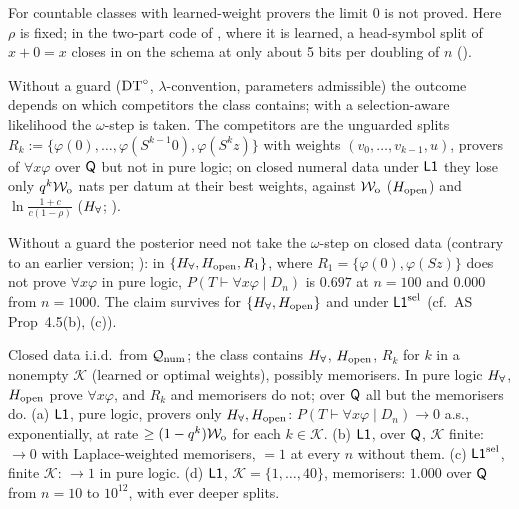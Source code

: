 \noindent For countable classes with learned-weight provers the limit $0$ is not proved. Here $\rho$ is fixed; in the two-part code of , where it is learned, a head-symbol split of $x+0=x$ closes in on the schema at only about 5 bits per doubling of $n$ ().

Without a guard ($\mathrm{DT}^{\circ}$, $\lambda$-convention, parameters admissible) the outcome depends on which competitors the class contains; with a selection-aware likelihood the $\omega$-step is taken. The competitors are the unguarded splits $R_k:=\{\varphi(0),\dots,\varphi(S^{k-1}0),\varphi(S^kz)\}$ with weights $(v_0,\dots,v_{k-1},u)$, provers of $\forall x\varphi$ over $\mathsf{Q}$ but not in pure logic; on closed numeral data under $\mathord{\mathsf{L1}}$ they lose only $q^k\mathcal{W}_{\mathrm{o}}$ nats per datum at their best weights, against $\mathcal{W}_{\mathrm{o}}$ ($H_{\mathrm{open}}$) and $\ln\frac{1+c}{c(1-\rho)}$ ($H_{\forall}$; ).

\begin{remark}\label{rem:univ:openrefuted}
Without a guard the posterior need not take the $\omega$-step on closed data (contrary to an earlier version; ): in $\{H_{\forall},H_{\mathrm{open}},R_1\}$, where $R_1=\{\varphi(0),\varphi(Sz)\}$ does not prove $\forall x\varphi$ in pure logic, $P(T\vdash\forall x\varphi\mid D_n)$ is $0.697$ at $n=100$ and $0.000$ from $n=1000$. The claim survives for $\{H_{\forall},H_{\mathrm{open}}\}$ and under $\mathord{\mathsf{L1}}^{\mathrm{sel}}$ (cf.\ AS Prop~4.5(b), (c)).
\end{remark}

\begin{proposition}\label{prop:univ:noguard}
Closed data i.i.d.\ from $\mathcal{Q}_{\mathrm{num}}$; the class contains $H_{\forall}$, $H_{\mathrm{open}}$, $R_k$ for $k$ in a nonempty $\mathcal K$ (learned or optimal weights), possibly memorisers. In pure logic $H_{\forall}$, $H_{\mathrm{open}}$ prove $\forall x\varphi$, and $R_k$ and memorisers do not; over $\mathsf{Q}$ all but the memorisers do. \textup{(a)} $\mathord{\mathsf{L1}}$, pure logic, provers only $H_{\forall},H_{\mathrm{open}}$: $P(T\vdash\forall x\varphi\mid D_n)\to0$ a.s., exponentially, at rate $\ge(1-q^k)\mathcal{W}_{\mathrm{o}}$ for each $k\in\mathcal K$. \textup{(b)} $\mathord{\mathsf{L1}}$, over $\mathsf{Q}$, $\mathcal K$ finite: $\to0$ with Laplace-weighted memorisers, $=1$ at every $n$ without them. \textup{(c)}  $\mathord{\mathsf{L1}}^{\mathrm{sel}}$, finite $\mathcal K$: $\to1$ in pure logic. \textup{(d)}  $\mathord{\mathsf{L1}}$, $\mathcal K=\{1,\dots,40\}$, memorisers: $1.000$ over $\mathsf{Q}$ from $n=10$ to $10^{12}$, with ever deeper splits.
\end{proposition}


